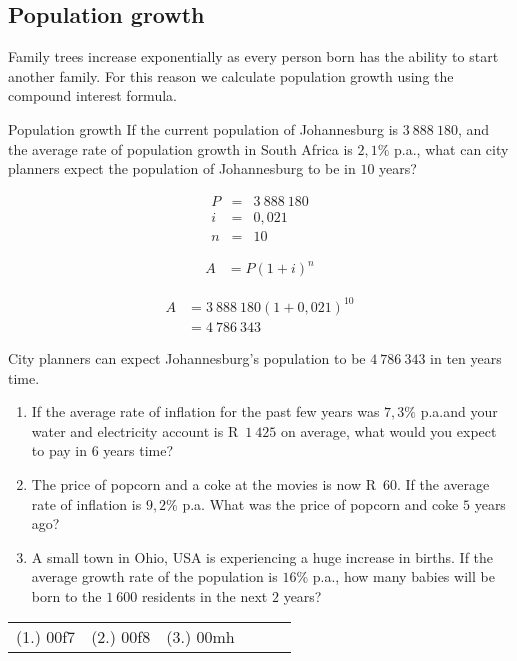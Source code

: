 \subsection{Population growth}

Family trees increase exponentially as every person born has the ability to start another family. For this reason we calculate population growth using the compound interest formula.


\begin{wex}{Population growth}
    {If the current population of Johannesburg is $3~888~180$, and the average rate of population growth in South Africa is $2,1\%$ p.a., what can city planners expect the population of Johannesburg to be in $10$ years?}{
    
    \begin{eqnarray*}
	P &=& 3~888~180\\
	i &=& 0,021\\
	n &=& 10
    \end{eqnarray*}

    \begin{align*}
	A &= P(1 + i)^n
    \end{align*}

    \begin{align*}
	A &= 3~888~180(1 + 0,021)^{10}\\
	  &= 4~786~343
    \end{align*}

    City planners can expect Johannesburg's population to be $4~786~343$ in ten years time.
    }
\end{wex}


\begin{exercises}{}{
    \begin{enumerate}[label=\textbf{\arabic*}.]
	\item If the average rate of inflation for the past few years was $7,3\%$ p.a.\@ and your water and electricity account is R~$1~425$ on average, what would you expect to pay in $6$ years time?

	\item The price of popcorn and a coke at the movies is now R~$60$. If the average rate of inflation is $9,2\%$ p.a. What was the price of popcorn and coke $5$ years ago?

	\item A small town in Ohio, USA is experiencing a huge increase in births. If the average growth rate of the population is $16\%$ p.a., how many babies will be born to the $1~600$ residents in the next $2$ years?\\
    \end{enumerate}
\practiceinfo

\begin{tabular}[h]{cccccc}
	(1.) 00f7&	(2.) 00f8&	(3.) 00mh
    \end{tabular}
}
\end{exercises}



